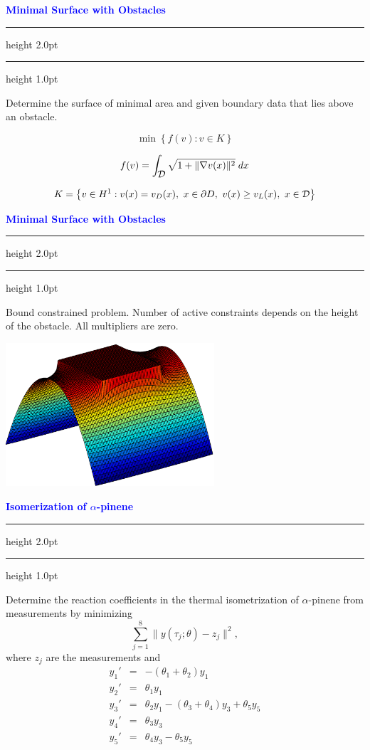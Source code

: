 \documentclass{seminar}
\newcommand{\grad}{\nabla}
\newcommand{\redstripe}{\textcolor{BrickRed}{\hrule height 2.0pt\hfil}
             \vspace{-1.8pt}
             \textcolor{BrickRed}{\hrule height 1.0pt\hfil}
}
\newcommand{\heading}[1]{%
   \vspace*{0.5pt}%
   \centerline{\textcolor{Blue}{\textbf{#1}}}%
   \redstripe
}
\newcommand{\cD} {\mbox{$\cal D$}}
\begin{document}
\begin{slide}

\heading{Minimal Surface with Obstacles}

Determine the surface of minimal area and given boundary data
that lies above an obstacle.

\[
\min \left \{ f(v) : v \in K \right \}
\]

\[
f(v) = \int_{\cD} \sqrt{ 1 + \| \grad v(x) \|^2 } \; dx
\]

\[
K = \left \{ v \in H^1 : v(x) = v_D (x) , \ x \in \partial D, \ 
                v(x) \ge v_L (x) ,\  x \in \cD \right \}
\]

\vfill

\end{slide}

\begin{slide}

\heading{Minimal Surface with Obstacles}

Bound constrained problem. 
Number of active constraints depends on the height of the
obstacle. All multipliers are zero. 
%
\centerline {\includegraphics[height=2.1in]{../images/mso.eps}}

\end{slide}

\begin{slide}

\heading{Isomerization of $ \alpha $-pinene}

Determine the reaction coefficients
in the thermal isometrization of $\alpha$-pinene from measurements by minimizing
\[
\sum _ {j=1}^8 \| y ( \tau_j ; \theta ) - z_j \| ^ 2 ,
\]
where $z_j$ are the measurements and
\begin{eqnarray*}
y_1'  & = & -(\theta_1 + \theta_2) y_1 \\
y_2'  & = & \theta_1 y_1 \\
y_3'  & = & \theta_2 y_1 - (\theta_3 + \theta_4 )y_3 + \theta_5 y_5 \\
y_4'  & = & \theta_3 y_3 \\
y_5'  & = & \theta_4 y_3 - \theta_5 y_5 \nonumber
\end{eqnarray*}

\end{slide}
\end{document}
